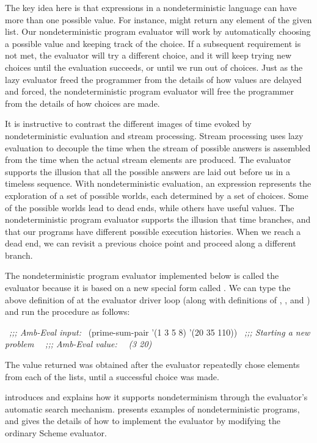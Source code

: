 The key idea here is that expressions in a nondeterministic language can have
more than one possible value.  For instance,  might return
any element of the given list.  Our nondeterministic program evaluator will
work by automatically choosing a possible value and keeping track of the
choice.  If a subsequent requirement is not met, the evaluator will try a
different choice, and it will keep trying new choices until the evaluation
succeeds, or until we run out of choices.  Just as the lazy evaluator freed the
programmer from the details of how values are delayed and forced, the
nondeterministic program evaluator will free the programmer from the details of
how choices are made.

It is instructive to contrast the different images of time evoked by
nondeterministic evaluation and stream processing.  Stream processing uses lazy
evaluation to decouple the time when the stream of possible answers is
assembled from the time when the actual stream elements are produced.  The
evaluator supports the illusion that all the possible answers are laid out
before us in a timeless sequence.  With nondeterministic evaluation, an
expression represents the exploration of a set of possible worlds, each
determined by a set of choices.  Some of the possible worlds lead to dead ends,
while others have useful values.  The nondeterministic program evaluator
supports the illusion that time branches, and that our programs have different
possible execution histories.  When we reach a dead end, we can revisit a
previous choice point and proceed along a different branch.

The nondeterministic program evaluator implemented below is called the
 evaluator because it is based on a new special form called
.  We can type the above definition of  at the
 evaluator driver loop (along with definitions of ,
, and ) and run the procedure as follows:

\begin{codeBlock}
~\textit{;;; Amb-Eval input:}~
(prime-sum-pair '(1 3 5 8) '(20 35 110))
~\textit{;;; Starting a new problem}~
~\textit{;;; Amb-Eval value:}~
~\textit{(3 20)}~
\end{codeBlock}

\noindent
The value returned was obtained after the evaluator repeatedly chose elements
from each of the lists, until a successful choice was made.

 introduces  and explains how it supports
nondeterminism through the evaluator's automatic search mechanism.
 presents examples of nondeterministic programs, and
 gives the details of how to implement the  evaluator by
modifying the ordinary Scheme evaluator.




